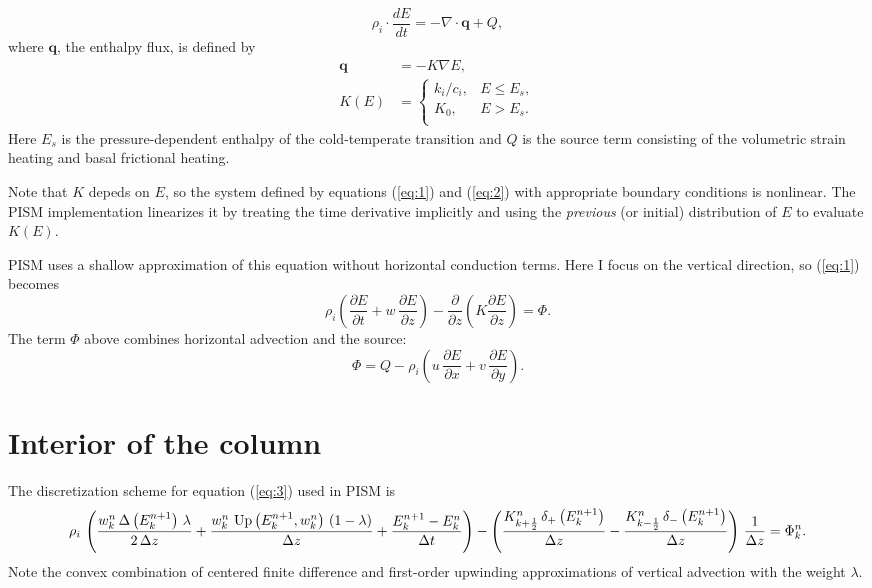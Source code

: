 \documentclass{article}
\newcommand{\diff}[2]{\frac{\partial #1}{\partial #2}}
\begin{document}
\begin{equation}
  \label{eq:1}
  \rho_{i} \cdot \frac{dE}{dt} = -\nabla\cdot\mathbf{q} + Q,
\end{equation}
where
$\mathbf{q}$, the enthalpy flux, is defined by
\begin{align}
  \label{eq:2}
  \mathbf{q} &= -K \nabla E,\\
  K(E) &=
  \begin{cases}
    k_{i}/c_{i}, & E \le E_{s},\\
    K_{0}, & E > E_{s}.\\
  \end{cases}
\end{align}
Here $E_{s}$ is the pressure-dependent enthalpy of the cold-temperate
transition and $Q$ is the source term consisting of the volumetric
strain heating and basal frictional heating.

Note that $K$ depeds on $E$, so the system defined by equations
(\ref{eq:1}) and (\ref{eq:2}) with appropriate boundary conditions is
nonlinear. The PISM implementation linearizes it by treating the time
derivative implicitly and using the \emph{previous} (or
initial) distribution of $E$ to evaluate $K(E)$.

PISM uses a shallow approximation of this equation without horizontal
conduction terms. Here I focus on the vertical direction, so
(\ref{eq:1}) becomes
\begin{equation}
  \label{eq:3}
  \rho_{i} \left( \diff{E}{t} + w\,\diff{E}{z} \right) - \diff{}{z}\left( K \diff{E}{z} \right) = \Phi.
\end{equation}
The term $\Phi$ above combines horizontal advection and the source:
\begin{equation}
  \label{eq:4}
    \Phi = Q - \rho_{i} \left( u\,\diff{E}{x} + v\,\diff{E}{y} \right).
\end{equation}

\section{Interior of the column}
\label{sec:interior}

The discretization scheme for equation (\ref{eq:3}) used in PISM is
\begin{equation}
  \label{eq:5}
  \rho_{i}\,\left(\frac{w^{n}_{k}\,\Delta\left(E^{n+1}_{k}\right)\,\lambda}{2\,\Delta z}+\frac{w^{n}_{k}\,\operatorname{Up}\left(E^{n+1}_{k} , w^{n}_{k}\right)\,\left(1-\lambda\right)}{\Delta z}+\frac{E^{n+1}_{k}-E^{n}_{k}}{\Delta t}\right)-\left(\frac{K^{n}_{k+\frac{1}{2}}\,\mathbf{\delta}_{+}\left(E^{n+1}_{k}\right)}{\Delta z}-\frac{K^{n}_{k-\frac{1}{2}}\,\mathbf{\delta}_{-}\left(E^{n+1}_{k}\right)}{\Delta z}\right)\,\frac{1}{\Delta z}=\Phi^{n}_{k}.
\end{equation}
Note the convex combination of centered finite difference and
first-order upwinding approximations of vertical advection with the
weight $\lambda$.
\end{document}
